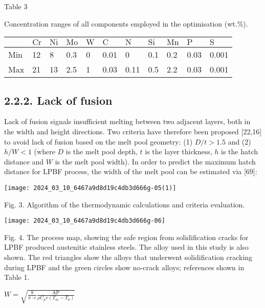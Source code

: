 \documentclass[10pt]{article}
\begin{document}
Table 3

Concentration ranges of all components employed in the optimisation (wt.\%).

\begin{center}
\begin{tabular}{lllllllllll}
\hline
 & $\mathrm{Cr}$ & $\mathrm{Ni}$ & $\mathrm{Mo}$ & $\mathrm{W}$ & $\mathrm{C}$ & $\mathrm{N}$ & $\mathrm{Si}$ & $\mathrm{Mn}$ & $\mathrm{P}$ & $\mathrm{S}$ \\
\hline
Min & 12 & 8 & 0.3 & 0 & 0.01 & 0 & 0.1 & 0.2 & 0.03 & 0.001 \\
Max & 21 & 13 & 2.5 & 1 & 0.03 & 0.11 & 0.5 & 2.2 & 0.03 & 0.001 \\
\hline
\end{tabular}
\end{center}

\subsection*{2.2.2. Lack of fusion}
Lack of fusion signals insufficient melting between two adjacent layers, both in the width and height directions. Two criteria have therefore been proposed [22,16] to avoid lack of fusion based on the melt pool geometry: (1) $D / t>1.5$ and (2) $h / W<1$ (where $D$ is the melt pool depth, $t$ is the layer thickness, $h$ is the hatch distance and $W$ is the melt pool width). In order to predict the maximum hatch distance for LPBF process, the width of the melt pool can be estimated via [69]:

\begin{center}
\texttt{[image: 2024\_03\_10\_6467a9d8d19c4db3d666g-05(1)]}
\end{center}

Fig. 3. Algorithm of the thermodynamic calculations and criteria evaluation.

\begin{center}
\texttt{[image: 2024\_03\_10\_6467a9d8d19c4db3d666g-06]}
\end{center}

Fig. 4. The process map, showing the safe region from solidification cracks for LPBF produced austenitic stainless steels. The alloy used in this study is also shown. The red triangles show the alloys that underwent solidification cracking during LPBF and the green circles show no-crack alloys; references shown in Table 1.

$W=\sqrt{\frac{8}{\pi \cdot e} \frac{\mathrm{AP}}{\rho C_{p} v\left(T_{m}-T_{0}\right)}}$
\end{document}
